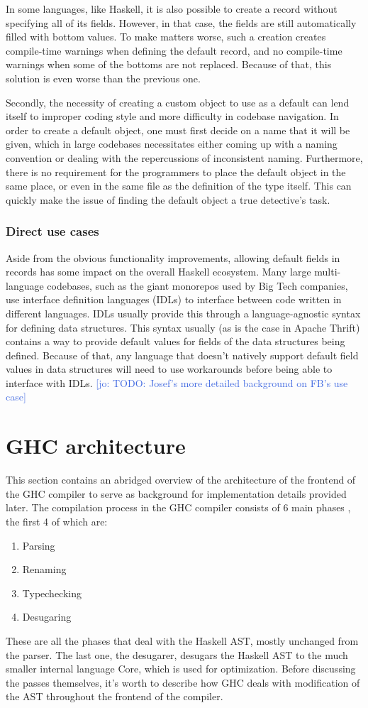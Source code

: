 \documentclass[en]{pracamgr}
\newcommand{\jcom}[1]{\textcolor{RoyalBlue}{[jo: #1]}}
\begin{document}
In some languages, like Haskell, it is also possible to create a record without specifying all of its fields.
However, in that case, the fields are still automatically filled with bottom values.
To make matters worse, such a creation creates compile-time warnings when defining the default record, and no compile-time warnings when some of the bottoms are not replaced.
Because of that, this solution is even worse than the previous one.

Secondly, the necessity of creating a custom object to use as a default can lend itself to improper coding style and more difficulty in codebase navigation.
In order to create a default object, one must first decide on a name that it will be given, which in large codebases necessitates either coming up with a naming convention or dealing with the repercussions of inconsistent naming. 
Furthermore, there is no requirement for the programmers to place the default object in the same place, or even in the same file as the definition of the type itself.
This can quickly make the issue of finding the default object a true detective's task. 

\subsection{Direct use cases}
Aside from the obvious functionality improvements, allowing default fields in records has some impact on the overall Haskell ecosystem.
Many large multi-language codebases, such as the giant monorepos used by Big Tech companies, use interface definition languages (IDLs) to interface between code written in different languages.
IDLs usually provide this through a language-agnostic syntax for defining data structures. 
This syntax usually (as is the case in Apache Thrift) contains a way to provide default values for fields of the data structures being defined.
Because of that, any language that doesn't natively support default field values in data structures will need to use workarounds before being able to interface with IDLs.
\jcom{TODO: Josef's more detailed background on FB's use case}

\chapter{GHC architecture}
This section contains an abridged overview of the architecture of the frontend of the GHC compiler to serve as background for implementation details provided later.
The compilation process in the GHC compiler consists of 6 main phases \cite{GHCIntermediateForms}, the first 4 of which are:
\begin{enumerate}
  \item Parsing
  \item Renaming
  \item Typechecking 
  \item Desugaring 
\end{enumerate}
These are all the phases that deal with the Haskell AST, mostly unchanged from the parser. 
The last one, the desugarer, desugars the Haskell AST to the much smaller internal language Core, which is used for optimization.
Before discussing the passes themselves, it's worth to describe how GHC deals with modification of the AST throughout the frontend of the compiler.
\end{document}
